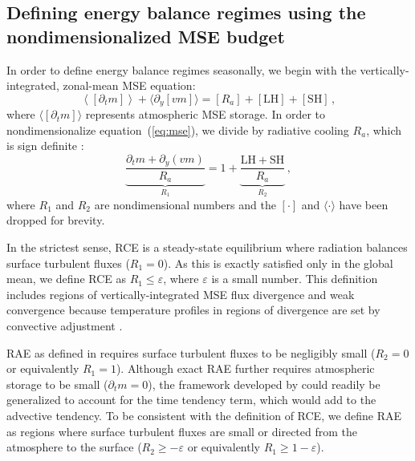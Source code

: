 \documentclass{ametsocV5}
\begin{document}
    \subsection{Defining energy balance regimes using the nondimensionalized MSE budget} \label{subsec:mse}
    In order to define energy balance regimes seasonally, we begin with the vertically-integrated, zonal-mean MSE equation:
    \begin{equation} \label{eq:mse}
        \left\langle\left[\partial_t m\right]\right\rangle + \langle\partial_y [vm]\rangle = [R_{a}] + \mathrm{[LH]+[SH]} \, ,
    \end{equation}
    where $\langle[\partial_t m]\rangle$ represents atmospheric MSE storage. In order to nondimensionalize equation~(\ref{eq:mse}), we divide by radiative cooling $R_a$, which is sign definite :
    \begin{equation}
        {\underbrace{\frac{\partial_t m + \partial_y (vm)}{R_{a}}}_{R_1}} = 1 + {\underbrace{\frac{\mathrm{LH+SH}}{R_{a}}}_{R_2}} \, ,
    \end{equation}
    where $R_1$ and $R_2$ are nondimensional numbers and the $[\cdot]$ and $\langle\cdot\rangle$ have been dropped for brevity. 

    In the strictest sense, RCE is a steady-state equilibrium where radiation balances surface turbulent fluxes (\(R_{1}=0\)). As this is exactly satisfied only in the global mean, we define RCE as \(R_{1}\le \varepsilon\), where $\varepsilon$ is a small number. This definition includes regions of vertically-integrated MSE flux divergence and weak convergence because temperature profiles in regions of divergence are set by convective adjustment \citep{warren2020}.

    RAE as defined in \cite{cronin2016} requires surface turbulent fluxes to be negligibly small (\(R_{2}=0\) or equivalently \(R_{1}=1\)). Although exact RAE further requires atmospheric storage to be small ($\partial_t m=0$), the framework developed by \cite{cronin2016} could readily be generalized to account for the time tendency term, which would add to the advective tendency. To be consistent with the definition of RCE, we define RAE as regions where surface turbulent fluxes are small or directed from the atmosphere to the surface (\(R_{2} \ge -\varepsilon \) or equivalently \(R_{1} \ge 1-\varepsilon\)).
\end{document}
